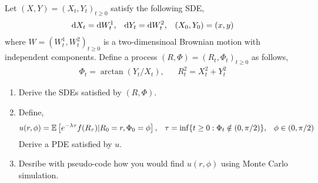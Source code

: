 \begin{problem}
    Let \( (X,Y) = (X_t,Y_t)_{t\geq 0} \) satisfy the following SDE,
    \begin{align*}
        \mathrm{d} X_t = \mathrm{d} W_t^1, && \mathrm{d} Y_t = \mathrm{d} W_t^2, && (X_0,Y_0) = (x,y)
    \end{align*}
    where \( W = (W_t^1,W_t^2)_{t\geq 0} \) is a two-dimensinoal Brownian motion with independent components. Define a process \( (R,\Phi) = (R_t,\Phi_t)_{t\geq 0} \) as follows,
    \begin{align*}
        \Phi_t = \arctan(Y_t/X_t), && R_t^2 = X_t^2 + Y_t^2
    \end{align*}
    \begin{enumerate}[nolistsep,label=(\alph*)]
        \item Derive the SDEs satisfied by \( (R,\Phi) \).
        \item Define,
            {\small
            \begin{align*}
                u(r,\phi) = \mathbb{E} \left[ e^{-\lambda \tau} f(R_\tau) | R_0 = r,\Phi_0 = \phi \right], &&
                \tau = \inf\{t\geq 0:\Phi_t\notin(0,\pi/2)\}, &&
                \phi \in (0,\pi/2)
            \end{align*}
            }
            Derive a PDE satisfied by \( u \).
        \item Desribe with pseudo-code how you would find \( u(r,\phi) \) using Monte Carlo simulation.
    \end{enumerate}    
\end{problem}

